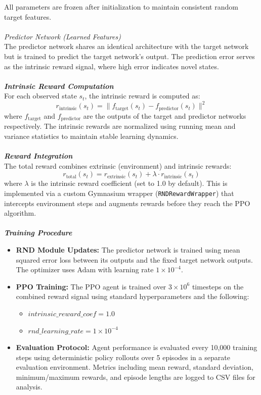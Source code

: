 \documentclass[twocolumn]{article}
\begin{document}
All parameters are frozen after initialization to maintain consistent random target features.\\\\
\textit{Predictor Network (Learned Features)} \\
The predictor network shares an identical architecture with the target network but is trained to predict the target network's output. The prediction error serves as the intrinsic reward signal, where high error indicates novel states.\\\\
\textbf{\textit{Intrinsic Reward Computation}}\\
For each observed state $s_t$, the intrinsic reward is computed as:
\begin{equation}
r_{\text{intrinsic}}(s_t) = \|f_{\text{target}}(s_t) - f_{\text{predictor}}(s_t)\|^2
\end{equation}
where $f_{\text{target}}$ and $f_{\text{predictor}}$ are the outputs of the target and predictor networks respectively. The intrinsic rewards are normalized using running mean and variance statistics to maintain stable learning dynamics.\\\\
\textbf{\textit{Reward Integration}}\\
The total reward combines extrinsic (environment) and intrinsic rewards:
\begin{equation}
r_{\text{total}}(s_t) = r_{\text{extrinsic}}(s_t) + \lambda \cdot r_{\text{intrinsic}}(s_t)
\end{equation}
where $\lambda$ is the intrinsic reward coefficient (set to 1.0 by default). This is implemented via a custom Gymnasium wrapper (\texttt{RNDRewardWrapper}) that intercepts environment steps and augments rewards before they reach the PPO algorithm.\\\\
\textbf{\textit{Training Procedure}}
\begin{itemize}
    \item \textbf{RND Module Updates:} The predictor network is trained using mean squared error loss between its outputs and the fixed target network outputs. The optimizer uses Adam with learning rate $1 \times 10^{-4}$.

    \item \textbf{PPO Training:} The PPO agent is trained over $3\times10^6$ timesteps on the combined reward signal using standard hyperparameters and the following:
\begin{itemize}
    \item $intrinsic\_reward\_coef=1.0$
    \item $rnd\_learning\_rate=1\times10^{-4}$
\end{itemize}

\item \textbf{Evaluation Protocol:} Agent performance is evaluated every 10,000 training steps using deterministic policy rollouts over 5 episodes in a separate evaluation environment. Metrics including mean reward, standard deviation, minimum/maximum rewards, and episode lengths are logged to CSV files for analysis.
\end{itemize}
\end{document}
